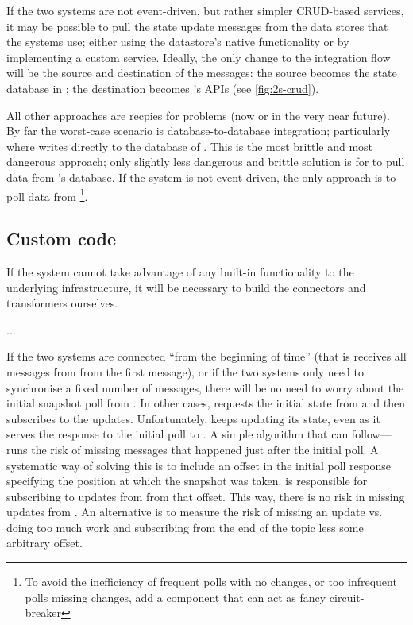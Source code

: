 If the two systems are not event-driven, but rather simpler CRUD-based services, it may be possible to pull the state update messages from the data stores that the systems use; either using the datastore's native functionality or by implementing a custom service. Ideally, the only change to the integration flow will be the source and destination of the messages: the source becomes the state database in ; the destination becomes 's APIs (see \autoref{fig:2s-crud}). 


All other approaches are recpies for problems (now or in the very near future). By far the worst-case scenario is database-to-database integration; particularly where  writes directly to the database of . This is the most brittle and most dangerous approach; only slightly less dangerous and brittle solution is for  to pull data from 's database. If the system  is not event-driven, the only approach is to poll data from \footnote{To avoid the inefficiency of frequent polls with no changes, or too infrequent polls missing changes, add a component that can act as fancy circuit-breaker}. 

\subsection{Custom code}
If the system cannot take advantage of any built-in functionality to the underlying infrastructure, it will be necessary to build the connectors and transformers ourselves. 

...

If the two systems are connected ``from the beginning of time'' (that is  receives all messages from  from the first message), or if the two systems only need to synchronise a fixed number of messages, there will be no need to worry about the initial snapshot poll from . In other cases,  requests the initial state from  and then subscribes to the updates. Unfortunately,  keeps updating its state, even as it serves the response to the initial poll to . A simple algorithm that  can follow----runs the risk of missing messages that happened just after the initial poll. A systematic way of solving this is to include an offset in the initial poll response specifying the position at which the snapshot was taken.  is responsible for subscribing to updates from  from that offset. This way, there is no risk in missing updates from . An alternative is to measure the risk of missing an update vs. doing too much work and subscribing from the end of the topic less some arbitrary offset.

